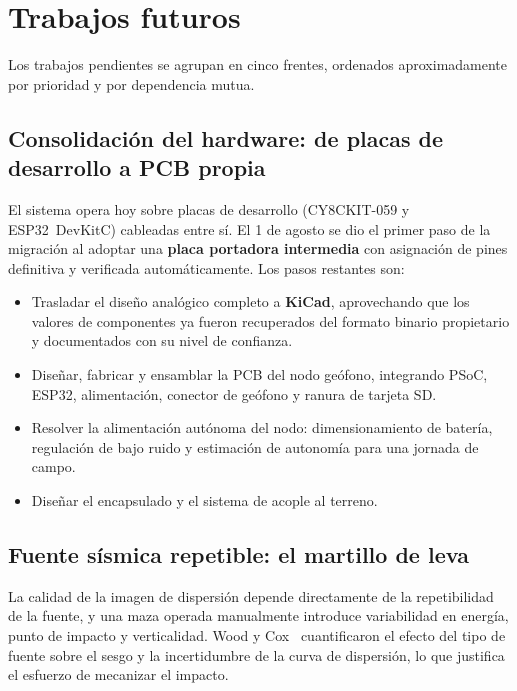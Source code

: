 \section{Trabajos futuros}
\label{sec:futuros}

Los trabajos pendientes se agrupan en cinco frentes, ordenados aproximadamente por
prioridad y por dependencia mutua.

\subsection{Consolidaci\'on del hardware: de placas de desarrollo a PCB propia}

El sistema opera hoy sobre placas de desarrollo (CY8CKIT-059 y ESP32~DevKitC) cableadas
entre s\'i. El 1 de agosto se dio el primer paso de la migraci\'on al adoptar una
\textbf{placa portadora intermedia} con asignaci\'on de pines definitiva y verificada
autom\'aticamente. Los pasos restantes son:

\begin{itemize}[itemsep=0.15em]
    \item Trasladar el dise\~no anal\'ogico completo a \textbf{KiCad}, aprovechando que los
    valores de componentes ya fueron recuperados del formato binario propietario y
    documentados con su nivel de confianza.
    \item Dise\~nar, fabricar y ensamblar la PCB del nodo ge\'ofono, integrando PSoC, ESP32,
    alimentaci\'on, conector de ge\'ofono y ranura de tarjeta SD.
    \item Resolver la alimentaci\'on aut\'onoma del nodo: dimensionamiento de bater\'ia,
    regulaci\'on de bajo ruido y estimaci\'on de autonom\'ia para una jornada de campo.
    \item Dise\~nar el encapsulado y el sistema de acople al terreno.
\end{itemize}

\subsection{Fuente s\'ismica repetible: el martillo de leva}

La calidad de la imagen de dispersi\'on depende directamente de la repetibilidad de la
fuente, y una maza operada manualmente introduce variabilidad en energ\'ia, punto de
impacto y verticalidad. Wood y Cox~\cite{Wood2012} cuantificaron el efecto del tipo de
fuente sobre el sesgo y la incertidumbre de la curva de dispersi\'on, lo que justifica el
esfuerzo de mecanizar el impacto.

